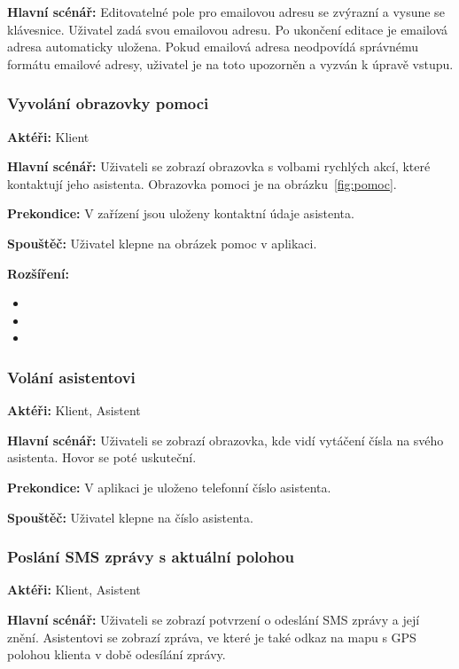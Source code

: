 \documentclass[czech,master,public,dept460,male,java,cpdeclaration]{diploma}
\newcommand{\usecase}[2]{\subsubsection{#1}\label{#2}}
\begin{document}
\vspace{0.1cm}
\noindent
\textbf{Hlavní scénář:} Editovatelné pole pro emailovou adresu se zvýrazní a vysune se klávesnice.
Uživatel zadá svou emailovou adresu. Po ukončení editace je emailová adresa automaticky uložena.
Pokud emailová adresa neodpovídá správnému formátu emailové adresy, uživatel je na toto upozorněn
a vyzván k úpravě vstupu.



\usecase{Vyvolání obrazovky pomoci}{pomoc}
\textbf{Aktéři:} Klient

\vspace{0.1cm}
\noindent
\textbf{Hlavní scénář:} Uživateli se zobrazí obrazovka s volbami rychlých akcí,
které kontaktují jeho asistenta. Obrazovka pomoci je na obrázku~\ref{fig:pomoc}.

\vspace{0.1cm}
\noindent
\textbf{Prekondice:} V zařízení jsou uloženy kontaktní údaje asistenta.

\vspace{0.1cm}
\noindent
\textbf{Spouštěč:} Uživatel klepne na obrázek pomoc v aplikaci.

\vspace{0.1cm}
\noindent
\textbf{Rozšíření:}
\begin{itemize}
  \item {}
  \item {}
  \item {}
\end{itemize}



\usecase{Volání asistentovi}{pomocvolani}
\textbf{Aktéři:} Klient, Asistent

\vspace{0.1cm}
\noindent
\textbf{Hlavní scénář:} Uživateli se zobrazí obrazovka, kde vidí vytáčení čísla na svého asistenta.
Hovor se poté uskuteční.

\vspace{0.1cm}
\noindent
\textbf{Prekondice:} V aplikaci je uloženo telefonní číslo asistenta.

\vspace{0.1cm}
\noindent
\textbf{Spouštěč:} Uživatel klepne na číslo asistenta.

\usecase{Poslání SMS zprávy s aktuální polohou}{pomocsms}
\textbf{Aktéři:} Klient, Asistent

\vspace{0.1cm}
\noindent
\textbf{Hlavní scénář:} Uživateli se zobrazí potvrzení o odeslání SMS zprávy a její znění.
Asistentovi se zobrazí zpráva, ve které je také odkaz na mapu s GPS polohou klienta v době odesílání zprávy.
\end{document}

